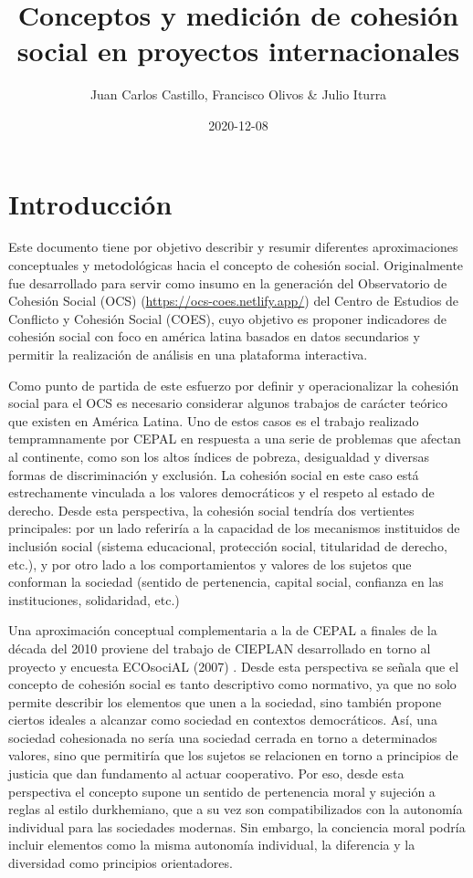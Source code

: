 \documentclass[
  12pt,
]{book}
\title{Conceptos y medición de cohesión social en proyectos internacionales}
\author{Juan Carlos Castillo, Francisco Olivos \& Julio Iturra}
\date{2020-12-08}
\begin{document}
\maketitle

{
\setcounter{tocdepth}{1}
\tableofcontents
}
\listoftables
\listoffigures
{}
\hypertarget{introducciuxf3n}{%
\chapter*{Introducción}\label{introducciuxf3n}}

Este documento tiene por objetivo describir y resumir diferentes aproximaciones conceptuales y metodológicas hacia el concepto de cohesión social. Originalmente fue desarrollado para servir como insumo en la generación del Observatorio de Cohesión Social (OCS) (\url{https://ocs-coes.netlify.app/}) del Centro de Estudios de Conflicto y Cohesión Social
(COES), cuyo objetivo es proponer indicadores de cohesión social con foco en américa latina basados en datos secundarios y permitir la realización de análisis en una plataforma interactiva.

Como punto de partida de este esfuerzo por definir y operacionalizar la
cohesión social para el OCS es necesario considerar algunos trabajos de
carácter teórico que existen en América Latina. Uno de estos casos es el
trabajo realizado tempramnamente por CEPAL \citep{ottone2007cohesion} en respuesta a una serie de problemas que afectan al continente, como son los altos índices de
pobreza, desigualdad y diversas formas de discriminación y exclusión. La
cohesión social en este caso está estrechamente vinculada a los valores
democráticos y el respeto al estado de derecho. Desde esta perspectiva, la cohesión social tendría dos vertientes principales: por un lado referiría a la capacidad de los mecanismos instituidos de inclusión social (sistema educacional,
protección social, titularidad de derecho, etc.), y por otro lado a los
comportamientos y valores de los sujetos que conforman la sociedad
(sentido de pertenencia, capital social, confianza en las instituciones,
solidaridad, etc.)

Una aproximación conceptual complementaria a la de CEPAL a finales de la década del 2010 proviene del trabajo de CIEPLAN desarrollado en torno al proyecto y encuesta ECOsociAL (2007) \citep{tironibarrios_Redes_2008}. Desde esta perspectiva se señala que el concepto de cohesión social es tanto descriptivo como normativo, ya que no solo permite describir los elementos que unen a la sociedad, sino también propone ciertos ideales a alcanzar como sociedad en contextos democráticos. Así, una sociedad cohesionada no sería una sociedad cerrada en torno a determinados valores, sino que permitiría que los sujetos se relacionen en torno a principios de justicia que dan fundamento al actuar cooperativo. Por eso, desde esta perspectiva el concepto supone un sentido de pertenencia moral y sujeción a reglas al estilo durkhemiano, que a su vez son compatibilizados con la autonomía individual para las sociedades modernas. Sin embargo, la conciencia moral podría incluir elementos como la misma autonomía individual, la diferencia y la diversidad como principios orientadores.
\end{document}

